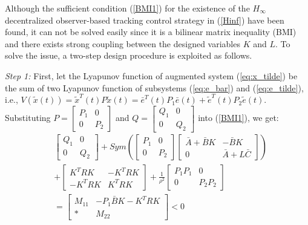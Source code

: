 \documentclass{ieeeaccess}
\begin{document}
Although the sufficient condition (\ref{BMI1}) for the existence of the $H_\infty$ decentralized observer-based tracking control strategy in (\ref{Hinf}) have been found, it can not be solved easily since it is a bilinear matrix inequality (BMI) and there exists strong coupling between the designed variables $K$ and $L$. To solve the issue, a two-step design procedure is exploited as follows.

\textit{Step 1:} First, let the Lyapunov function of augmented system (\ref{eq:x_tilde}) be the sum of two Lyapunov function of subsystems (\ref{eq:e_bar}) and (\ref{eq:e_tilde}), i.e., $V(\tilde{x}(t))=\tilde{x}^T(t)P\tilde{x}(t)=\bar{e}^T(t)P_1\bar{e}(t)+\tilde{e}^T(t)P_2\tilde{e}(t)$. Substituting $P=\begin{bmatrix}
    P_1 & 0 \\ 0 & P_2
\end{bmatrix}$ and $Q=\begin{bmatrix}
    Q_1 & 0 \\ 0 & Q_2
\end{bmatrix}$ into (\ref{BMI1}), we get:
\begin{equation} \label{eq:M}
    \begin{split}
        & \begin{bmatrix}
            Q_1 & 0 \\ 0 & Q_2
        \end{bmatrix} + Sym(\begin{bmatrix}
            P_1 & 0 \\ 0 & P_2
        \end{bmatrix}\begin{bmatrix}
            \bar{A}+\bar{B}K & -\bar{B}K \\ 0 & \bar{A}+L\bar{C}
        \end{bmatrix})  \\
        & + \begin{bmatrix}
            K^TRK & -K^TRK \\ -K^TRK & K^TRK
        \end{bmatrix} + \frac{1}{\rho^2}\begin{bmatrix}
            P_1P_1 & 0 \\ 0 & P_2P_2
        \end{bmatrix} \\
        & = \begin{bmatrix}
            M_{11} & -P_1\bar{B}K - K^TRK \\ * & M_{22}
        \end{bmatrix} < 0
    \end{split}
\end{equation}
\end{document}
